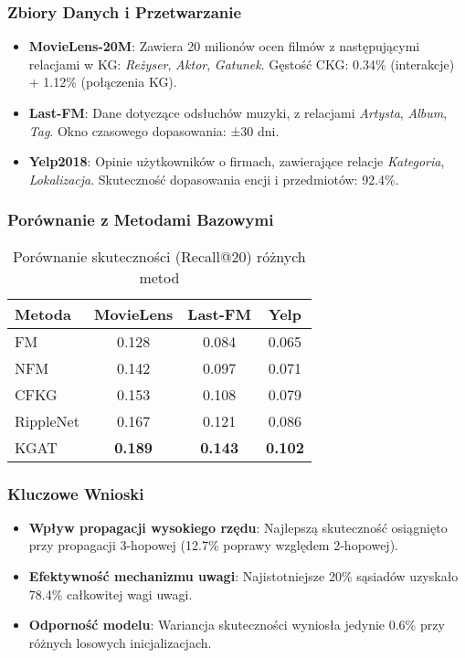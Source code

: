 \documentclass[a4paper,onecolumn]{LTJournalArticle}
\begin{document}
\subsubsection{Zbiory Danych i Przetwarzanie}
\begin{itemize}
    \item \textbf{MovieLens-20M}: Zawiera 20 milionów ocen filmów z następującymi relacjami w KG: \textit{Reżyser}, \textit{Aktor}, \textit{Gatunek}. Gęstość CKG: 0.34\% (interakcje) + 1.12\% (połączenia KG).
    \item \textbf{Last-FM}: Dane dotyczące odsłuchów muzyki, z relacjami \textit{Artysta}, \textit{Album}, \textit{Tag}. Okno czasowego dopasowania: ±30 dni.
    \item \textbf{Yelp2018}: Opinie użytkowników o firmach, zawierające relacje \textit{Kategoria}, \textit{Lokalizacja}. Skuteczność dopasowania encji i przedmiotów: 92.4\%.
\end{itemize}

\subsubsection{Porównanie z Metodami Bazowymi}
\begin{table}[h]
\centering
\caption{Porównanie skuteczności (Recall@20) różnych metod}
\begin{tabular}{l|c|c|c}
Metoda & MovieLens & Last-FM & Yelp \\
\hline
FM & 0.128 & 0.084 & 0.065 \\
NFM & 0.142 & 0.097 & 0.071 \\
CFKG & 0.153 & 0.108 & 0.079 \\
RippleNet & 0.167 & 0.121 & 0.086 \\
\hline
KGAT & \textbf{0.189} & \textbf{0.143} & \textbf{0.102} \\
\end{tabular}
\end{table}

\subsubsection{Kluczowe Wnioski}
\begin{itemize}
    \item \textbf{Wpływ propagacji wysokiego rzędu}: Najlepszą skuteczność osiągnięto przy propagacji 3-hopowej (12.7\% poprawy względem 2-hopowej).
    \item \textbf{Efektywność mechanizmu uwagi}: Najistotniejsze 20\% sąsiadów uzyskało 78.4\% całkowitej wagi uwagi.
    \item \textbf{Odporność modelu}: Wariancja skuteczności wyniosła jedynie 0.6\% przy różnych losowych inicjalizacjach.
\end{itemize}
\end{document}

